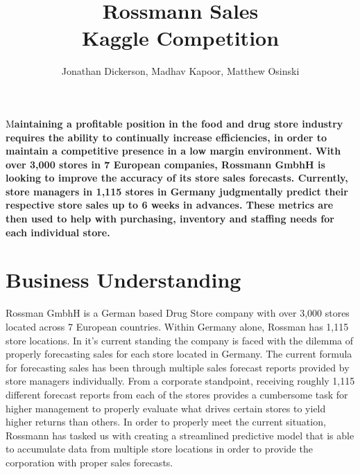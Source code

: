 \documentclass[DIV=calc, paper=a4, fontsize=11pt]{scrartcl}	 %
\title{Rossmann Sales\\ Kaggle Competition} %
\author{Jonathan Dickerson, Madhav Kapoor, Matthew Osinski \\ } %
\date{} %
\newcommand{\initial}[1]{ %
\lettrine[lines=3,lhang=0.3,nindent=0em]{
\color{DarkGoldenrod}
{\textsf{#1}}}{}}
\begin{document}
\maketitle %

\thispagestyle{fancy} %


\initial{M}\textbf{aintaining a profitable position in the food and drug store industry requires the ability to continually increase efficiencies, in order to maintain a competitive presence in a low margin environment. With over 3,000 stores in 7 European companies, Rossmann GmbhH is looking to improve the accuracy of its store sales forecasts. Currently, store managers in 1,115 stores in Germany judgmentally predict their respective store sales up to 6 weeks in advances. These metrics are then used to help with purchasing, inventory and staffing needs for each individual store.\cite{RossmannKaggle}}

\doublespacing
\section*{Business Understanding}

Rossman GmbhH is a German based Drug Store company with over 3,000 stores located 
across 7 European countries. Within Germany alone, Rossman has 1,115 store locations. In it’s 
current standing the company is faced with the dilemma of properly forecasting sales for each 
store located in Germany. The current formula for forecasting sales has been through multiple 
sales forecast reports provided by store managers individually. From a corporate standpoint, 
receiving roughly 1,115 different forecast reports from each of the stores provides a 
cumbersome task for higher management to properly evaluate what drives certain stores to 
yield higher returns than others. In order to properly meet the current situation, Rossmann has 
tasked us with creating a streamlined predictive model that is able to accumulate data from 
multiple store locations in order to provide the corporation with proper sales forecasts. 
\end{document}
